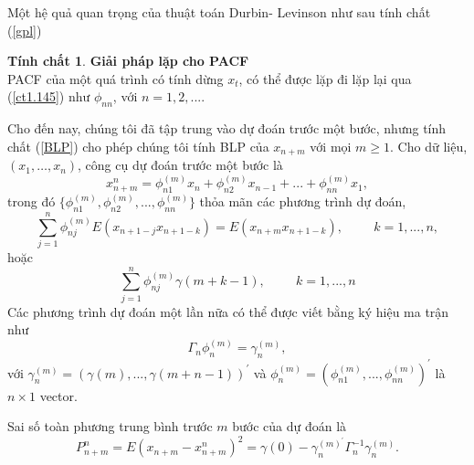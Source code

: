 \documentclass[12pt, a4paper,oneside]{book}
\theoremstyle{definition}
\newtheorem{tc}[theo]{Tính chất}
\begin{document}
Một hệ quả quan trọng của thuật toán Durbin- Levinson như sau tính chất (\ref{gpl})
\begin{tc} \textbf{\label{gpl}Giải pháp lặp cho PACF}\\
PACF của một quá trình có tính dừng $x_{t}$, có thể được lặp đi lặp lại qua (\ref{ct1.145}) như $\phi_{nn}$, với $n= 1,2,... .$
\end{tc}

Cho đến nay, chúng tôi đã tập trung vào dự đoán trước một bước, nhưng tính chất (\ref{BLP}) cho phép chúng tôi tính BLP của $x_{n+m}$ với mọi $m \geq 1$. Cho dữ liệu, $(x_{1} ,\dots, x_{n})$, công cụ dự đoán trước một bước là
 \begin{equation}
 x_{n+m}^{n}= \phi_{n1}^{(m)}x_{n} +\phi_{n2}^{(m)}x_{n-1}+...+\phi_{nn}^{(m)}x_{1}, \label{ct1.147}
 \end{equation}	
trong đó $\{\phi_{n1}^{(m)}, \phi_{n2}^{(m)},...,\phi_{nn}^{(m)}\}$ thỏa mãn các phương trình dự đoán,
$$\sum_{j=1}^{n}\phi_{nj}^{(m)}E(x_{n+1-j}x_{n+1-k})= E (x_{n+m}x_{n+1-k}),\hspace{1cm} k= 1,...,n,$$
hoặc 
\begin{equation}
\sum_{j=1}^{n}\phi_{nj}^{(m)}\gamma(m+k-1), \hspace{1cm} k=1,...,n \label{ct1.149}
\end{equation}	 
Các phương trình dự đoán một lần nữa có thể được viết bằng ký hiệu ma trận như
\begin{equation}
\Gamma_{n}\phi_{n}^{(m)}= \gamma_{n}^{(m)}, \label{ct1.150}
\end{equation}
với $\gamma_{n}^{(m)}= (\gamma(m),...,\gamma(m+n-1))^{'}$
và $\phi_{n}^{(m)} = (\phi_{n1}^{(m)},...,\phi_{nn}^{(m)})^{'}$ là $n\times 1$ vector.

Sai số toàn phương trung bình trước $m$ bước của dự đoán là
\begin{equation}
P_{n+m}^{n} = E (x_{n+m}- x_{n+m}^{n})^{2} = \gamma(0) - \gamma_{n}^{(m)^{'}}\Gamma_{n}^{-1}\gamma_{n}^{(m)}. \label{ct1.151}
\end{equation}
\end{document}
